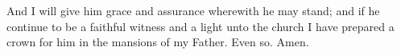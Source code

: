 		And I will give him grace and assurance wherewith he may stand; and if he continue to be a faithful witness and a light unto the church I have prepared a crown for him in the mansions of my Father.  Even so.  Amen.

